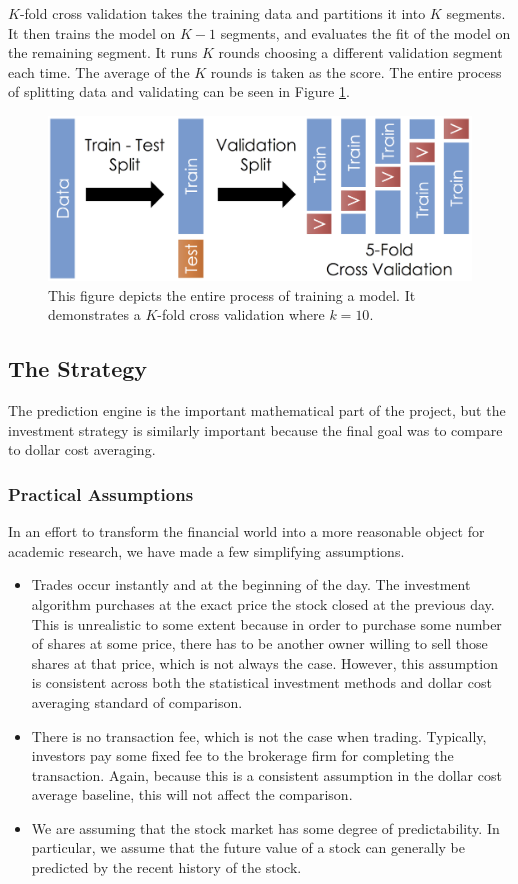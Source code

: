 \documentclass[12pt]{article}
\begin{document}
$K$-fold cross validation takes the training data and partitions it into $K$ segments. It then trains the model on $K-1$ segments, and evaluates the fit of the model on the remaining segment. It runs $K$ rounds choosing a different validation segment each time. The average of the $K$ rounds is taken as the score. The entire process of splitting data and validating can be seen in Figure \ref{test_train_validate}.

\begin{figure}[ht]
	\centering
	\includegraphics[width=.5\textwidth]{test_train_validate.png}
	\caption{This figure depicts the entire process of training a model. It demonstrates a $K$-fold cross validation where $k=10$. \cite{kfold2}}
	\label{test_train_validate}
\end{figure}

\subsection{The Strategy}
The prediction engine is the important mathematical part of the project, but the investment strategy is similarly important because the final goal was to compare to dollar cost averaging. 

\subsubsection{Practical Assumptions}
In an effort to transform the financial world into a more reasonable object for academic research, we have made a few simplifying assumptions.
\begin{itemize}
	\item Trades occur instantly and at the beginning of the day. The investment algorithm purchases at the exact price the stock closed at the previous day. This is unrealistic to some extent because in order to purchase some number of shares at some price, there has to be another owner willing to sell those shares at that price, which is not always the case. However, this assumption is consistent across both the statistical investment methods and dollar cost averaging standard of comparison.
	
	\item There is no transaction fee, which is not the case when trading. Typically, investors pay some fixed fee to the brokerage firm for completing the transaction. Again, because this is a consistent assumption in the dollar cost average baseline, this will not affect the comparison.
	
	
	\item We are assuming that the stock market has some degree of predictability. In particular, we assume that the future value of a stock can generally be predicted by the recent history of the stock.
\end{itemize}
\end{document}
